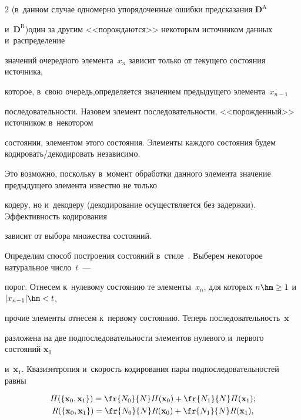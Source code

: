 \begin{multicols}{2}
(в~данном случае одномерно упорядоченные ошибки предсказания $\mathbf{D}^\text{A}$ 

и~$\mathbf{D}^\text{R}$)\linebreak один за другим <<порождаются>> некоторым источником данных и~распределение 

значений очередного элемента~$x_n$ зависит только от текущего со\-сто\-яния источника, 

которое, в~свою очередь,\linebreak \mbox{определяется} значением предыдущего элемента~$x_{n-1}$  

последовательности. Назовем элемент последовательности, <<порожденный>> источником в~некотором 

состоянии, элементом этого состояния. Элементы каждого состояния будем ко\-ди\-ро\-вать/де\-ко\-ди\-ро\-вать независимо. 

Это возможно, поскольку в~момент обработки данного элемента значение предыдущего элемента известно не только 

кодеру, но и~декодеру (декодирование осуществляется без задержки). Эффективность кодирования 

зависит от выбора множества состояний.



Определим способ построения состояний в~стиле~\cite{b5}. Выберем некоторое натуральное число~$t$~--- 

порог. Отнесем к~нулевому состоянию те элементы~$x_n$, для которых $n\hm\geq 1$ и~$|x_{n-1}|\hm<t$, 

прочие элементы отнесем к~первому состоянию. Теперь последовательность~$\mathbf{x}$  

разложена на две подпоследовательности элементов нулевого и~первого состояний $\mathbf{x}_0$ 

и~$\mathbf{x}_1$. Квазиэнтропия и~скорость кодирования пары подпоследовательностей равны

\begin{multline}

H(\{ \mathbf{x}_0, \mathbf{x}_1 \}) = 

\fr{N_0}{N}H(\mathbf{x}_0) + \fr{N_1}{N}H(\mathbf{x}_1); \\

R(\{ \mathbf{x}_0, \mathbf{x}_1 \}) = 

\fr{N_0}{N}R(\mathbf{x}_0) + \fr{N_1}{N}R(\mathbf{x}_1), 

\label{eq08}

\end{multline}


\end{multicols}
